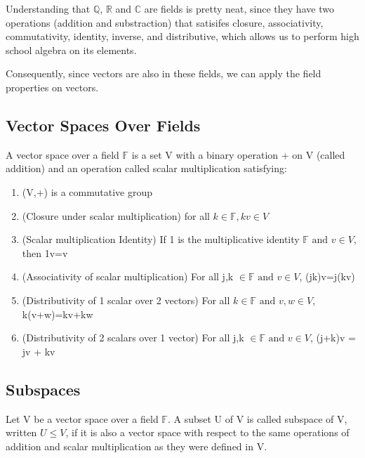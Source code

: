 \documentclass{article}
\begin{document}
Understanding that $\mathbb{Q}$, $\mathbb{R}$ and $\mathbb{C}$ are fields is pretty
neat, since they have two operations (addition and substraction) that satisifes
closure, associativity, commutativity, identity, inverse, and distributive,
which allows us to perform high school algebra on its elements.

Consequently, since vectors are also in these fields, we can apply the field
properties on vectors.

\subsection{Vector Spaces Over Fields}

\begin{definition}
    A vector space over a field $\mathbb{F}$ is a set V with a binary operation +
    on V (called addition) and an operation called scalar multiplication satisfying:
    \begin{enumerate}
	\item (V,+) is a commutative group
	\item (Closure under scalar multiplication) for all $ k \in \mathbb{F},
	    kv \in V$
	\item (Scalar multiplication Identity) If 1 is the multiplicative identity
	    $\mathbb{F} \text{ and } v \in V$, then 1v=v
	\item (Associativity of scalar multiplication) For all j,k $\in \mathbb{F}
	    \text{ and } v \in V$, (jk)v=j(kv)
	\item (Distributivity of 1 scalar over 2 vectors) For all $ k \in \mathbb{F}
	    \text{ and } v,w \in V$, k(v+w)=kv+kw
	\item (Distributivity of 2 scalars over 1 vector) For all j,k $\in
	    \mathbb{F} \text{ and } v \in V$, (j+k)v = jv + kv
    \end{enumerate}
\end{definition}

\subsection{Subspaces}

\begin{definition}[Subspace]
    Let V be a vector space over a field $\mathbb{F}$. A subset U of V is called
    subspace of V, written $ U \leq V$, if it is also a vector space with respect
    to the same operations of addition and scalar multiplication as they were
    defined in V.
\end{definition}
\end{document}
